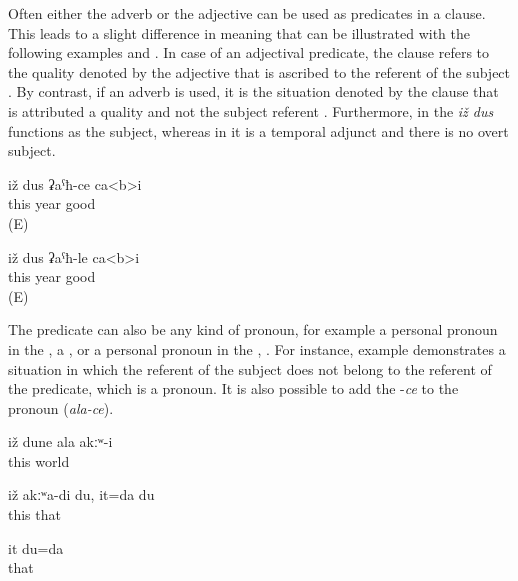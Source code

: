Often either the adverb or the adjective can be used as predicates in a  clause. This leads to a slight difference in meaning that can be illustrated with the following examples  and . In case of an adjectival predicate, the  clause refers to the quality denoted by the adjective that is ascribed to the referent of the subject . By contrast, if an adverb is used, it is the situation denoted by the  clause that is attributed a quality and not the subject referent . Furthermore, in  the  \textit{iž dus} functions as the subject, whereas in  it is a temporal adjunct and there is no overt subject.
%
\begin{exe}

	\ex	\label{ex:This year is good}
	\gll	iž	dus	ʡaˁħ-ce	ca<b>i\\
		this	year	good	\\
	\glt	{} (E)
	
	
	\ex	\label{ex:In / during this year it is good}
	\gll	iž	dus	ʡaˁħ-le	ca<b>i\\
		this	year	good	\\
	\glt	{} (E)

\end{exe}

The predicate can also be any kind of pronoun, for example a personal pronoun in the  , a , or a personal pronoun in the  , . For instance, example  demonstrates a situation in which the referent of the  subject does not belong to the referent of the predicate, which is a  pronoun. It is also possible to add the  -\textit{ce} to the  pronoun (\textit{ala-ce}).
%
\begin{exe}
	\ex	\label{ex:‎‎This world was not yours}
	\gll	iž	dune	ala	akːʷ-i\\
		this	world		\\
	\glt	{}
	
	\ex	\label{ex:‎‎‎This is not me, that is me}
	\gll	iž	akːʷa-di	du,	it=da	du\\
		this			that	\\
	\glt	{}

	\ex	\label{ex:That is me}
	\gll	it	du=da\\
		that	\\
	\glt	{}
\end{exe}

